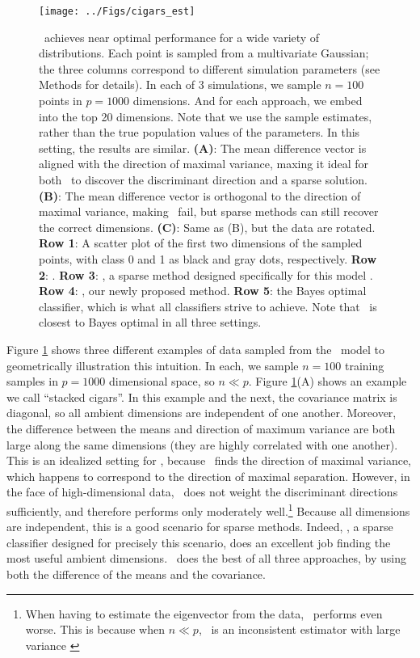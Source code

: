 \documentclass[10pt]{article}
\begin{document}
\begin{figure}%
\centering
\texttt{[image: ../Figs/cigars\_est]}%
\caption{
\Lol~achieves near optimal performance for a wide variety of distributions. 
Each point is sampled from a multivariate Gaussian; 
the three columns correspond to different simulation parameters (see Methods for details).  
In each of 3 simulations, we sample $n=100$ points in $p=1000$ dimensions.  And for each approach, we embed into the top 20 dimensions. Note that we use the sample estimates, rather than the true population values of the parameters.  In this setting, the results are  similar.
\textbf{(A)}: The mean difference vector is aligned with the direction of maximal variance, maxing it ideal for both \Pca~to discover the discriminant direction and a sparse solution.  
\textbf{(B)}: The mean difference vector is orthogonal to the direction of maximal variance, making \Pca~fail, but sparse methods can still recover the correct dimensions.
\textbf{(C)}: Same as (B), but the data are rotated.  
\textbf{Row 1}: A scatter plot of the first two dimensions of the sampled points, with class 0 and 1 as black and gray dots, respectively.  
\textbf{Row 2}: .
\textbf{Row 3}: , a sparse method designed specifically for this model \cite{Fan2012a}.
\textbf{Row 4}: \Lol, our newly proposed method.
\textbf{Row 5}: the Bayes optimal classifier, which is what all classifiers strive to achieve.
Note that \Lol~is closest to Bayes optimal in all three settings.
}
\label{f:cigars}
\end{figure}


Figure \ref{f:cigars} shows three different examples of data sampled from the \Lda~model to geometrically illustration this intuition.
In each, we sample $n=100$ training samples in $p=1000$ dimensional space, so $n \ll p$.  
Figure \ref{f:cigars}(A) shows an example we call  ``stacked cigars''. 
In this example and the next, the covariance matrix is diagonal, so all ambient dimensions are independent of one another.  
Moreover,  the difference between the means and direction of maximum variance are both large along the same dimensions (they are highly correlated with one another). 
This is an idealized setting for \Pca, because \Pca~finds the direction of maximal variance, which happens to correspond to the direction of maximal separation.  
However, in the face of high-dimensional data, \Pca~does not weight the discriminant directions sufficiently, and therefore performs only moderately well.\footnote{When having to estimate the eigenvector from the data, \Pca~performs even worse.  This is because when $n \ll p$, \Pca~is an inconsistent estimator with large variance \cite{Baik2006a,Paul2007a}}
Because all dimensions are independent, this is a good scenario for sparse methods.  
Indeed,  , a sparse classifier designed for precisely this scenario,  does an excellent job finding the most useful ambient dimensions.  
\Lol~does the best of all three approaches, by using both the difference of the means and the covariance.
\end{document}
